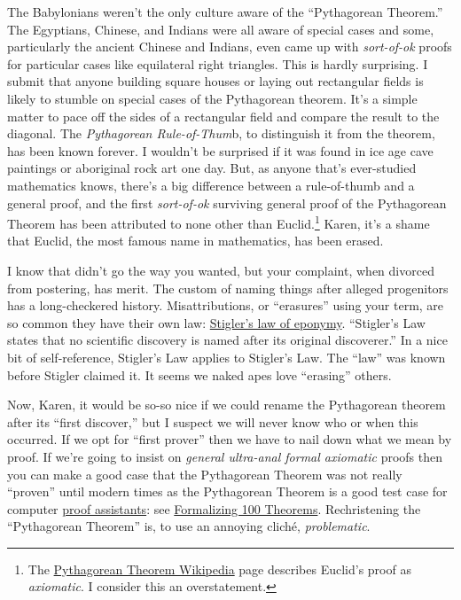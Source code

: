 
The Babylonians weren't the only culture aware of the ``Pythagorean
Theorem.'' The Egyptians, Chinese, and Indians were all aware of special
cases and some, particularly the ancient Chinese and Indians, even came
up with \emph{sort-of-ok} proofs for particular cases like equilateral
right triangles. This is hardly surprising. I submit that anyone
building square houses or laying out rectangular fields is likely to
stumble on special cases of the Pythagorean theorem. It's a simple
matter to pace off the sides of a rectangular field and compare the
result to the diagonal. The \emph{Pythagorean Rule-of-Thum}b, to
distinguish it from the theorem, has been known forever. I wouldn't be
surprised if it was found in ice age cave paintings or aboriginal rock
art one day. But, as anyone that's ever-studied mathematics knows,
there's a big difference between a rule-of-thumb and a general proof,
and the first \emph{sort-of-ok} surviving general proof of the
Pythagorean Theorem has been attributed to none other than
Euclid.\footnote{The
  \href{https://en.wikipedia.org/wiki/Pythagorean_theorem}{Pythagorean Theorem
  Wikipedia} page describes Euclid's proof as \emph{axiomatic}. I
  consider this an overstatement.
} Karen, it's a shame that Euclid, the most famous name in mathematics,
has been erased.

I know that didn't go the way you wanted, but your complaint, when
divorced from postering, has merit. The custom of naming things after
alleged progenitors has a long-checkered history. Misattributions, or
``erasures'' using your term, are so common they have their own law:
\href{https://en.wikipedia.org/wiki/Stigler\%27s_law_of_eponymy}{Stigler's
law of eponymy}. ``Stigler's Law states that no scientific
discovery is named after its original discoverer.'' In a nice bit of
self-reference, Stigler's Law applies to Stigler's Law. The ``law'' was
known before Stigler claimed it. It seems we naked apes love ``erasing''
others.

Now, Karen, it would be so-so nice if we could rename the Pythagorean
theorem after its ``first discover,'' but I suspect we will never know
who or when this occurred. If we opt for ``first prover'' then we have to
nail down what we mean by proof. If we're going to insist on
\emph{general ultra-anal formal axiomatic} proofs then you can
make a good case that the Pythagorean Theorem was not really ``proven''
until modern times as the Pythagorean Theorem is a good test case for
computer \href{https://en.wikipedia.org/wiki/Proof_assistant}{proof
assistants}: see \href{https://www.cs.ru.nl/~freek/100/}{Formalizing 100
Theorems}. Rechristening the ``Pythagorean Theorem'' is, to use an
annoying cliché, \emph{problematic}.

